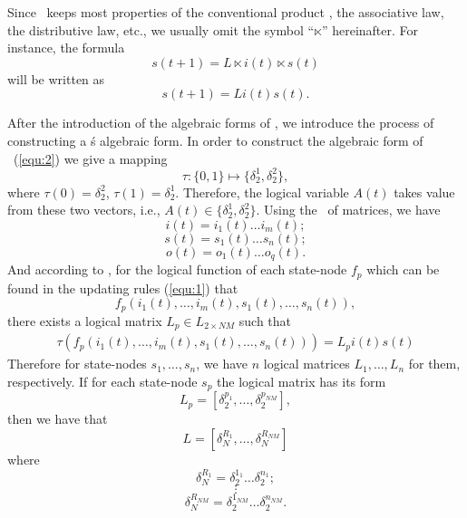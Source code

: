 Since \STP\ keeps most properties of the conventional product \cite{Cheng2011Analysis}, the associative law, the distributive law, etc., we usually omit the symbol ``$\ltimes$'' hereinafter. For instance, the 
formula \[s(t+1)=L\ltimes{i(t)}\ltimes{s(t)}\] will be written as  \[s(t+1)=L{i(t)}{s(t)}.\]

After the introduction of the algebraic forms of \BCNs, we introduce the process of constructing a \BCN\' s algebraic form. In order to construct the algebraic form of \BCN\ (\ref{equ:2}) we give a mapping \[\tau:\{0,1\}\mapsto \{\delta_2^1, \delta_2^2\},\] where $\tau(0)=\delta_2^2$, $\tau(1)= \delta_2^1$. 
Therefore, the logical variable $A(t)$ takes value from these two vectors, i.e., $A(t)\in \{\delta_2^1, \delta_2^2\}$. Using the \STP\ of matrices, we have 
\[i(t)=i_1(t){\ldots}i_m(t);\] 
\[s(t)=s_1(t){\ldots}s_n(t);\] 
\[o(t)=o_1(t){\ldots}o_q(t).\] 
And according to \cite{Cheng2003Semi}, for the logical function of each state-node $f_p$ which can be found in the updating rules (\ref{equ:1}) that
\[f_p(i_1(t),\ldots,i_m(t),s_1(t),\ldots,s_n(t)),\] 
there exists a logical matrix $L_p\in L_{2\times {NM}}$ such that
\begin{equation}
\begin{split}
\tau(f_p(i_1(t),\ldots,i_m(t),s_1(t),\ldots,s_n(t)))= L_pi(t)s(t)
\end{split}
\end{equation}
Therefore for state-nodes $s_1,\ldots,s_n$, we have $n$ logical matrices $L_1,\ldots,L_n$ for them, respectively. 
If for each state-node $s_p$ the logical matrix has its form
\[L_p=[\delta_2^{p_1},\ldots,\delta_2^{p_{NM}}],\] 
then we have that %
\[L=[\delta_N^{R_1},\ldots,\delta_N^{R_{NM}}]\]  where 
\[\delta_N^{R_1}=\delta_2^{1_1}\ldots\delta_2^{n_1};\]\[\vdots\] \[\delta_N^{R_{NM}}=\delta_2^{1_{NM}}\ldots\delta_2^{n_{NM}}.\] 


